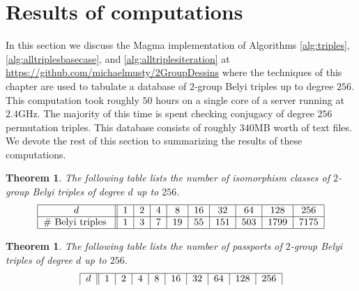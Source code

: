 \documentclass{dcthesis}
\numberwithin{equation}{section}
\newtheorem{theorem}[equation]{Theorem}
\theoremstyle{definition}
\theoremstyle{remark}
\begin{document}
{  \section{Results of computations}{\label{sec:grouptheorycomputations}
    In this section we discuss the
    \textsf{Magma} implementation of
    Algorithms
    \ref{alg:triples},
    \ref{alg:alltriplesbasecase},
    and
    \ref{alg:alltriplesiteration}
    at
    \url{https://github.com/michaelmusty/2GroupDessins}
    where the techniques of this chapter
    are used to tabulate a database
    of $2$-group Belyi triples
    up to degree $256$.
    This computation took roughly
    $50$ hours on a single core of a server
    running at $2.4$GHz.
    The majority
    of this time is spent
    checking conjugacy of degree $256$
    permutation triples.
    This database consists of
    roughly $340$MB worth of text files.
    We devote the rest of this section
    to summarizing the results of
    these computations.
    \begin{theorem}\label{thm:isoclasses}
      The following table lists
      the number of isomorphism classes of
      $2$-group Belyi triples
      of degree $d$ up to $256$.
      \begin{equation}
        \label{eqn:}
        \begin{tabular}{|c||c|c|c|c|c|c|c|c|c|}
          \hline
          $d$ & $1$ & $2$ & $4$ & $8$ & $16$ & $32$ & $64$ & $128$ & $256$\\
          \hline
          \#\text{ Belyi triples } & $1$ & $3$ & $7$ & $19$ & $55$ & $151$ & $503$ & $1799$ & $7175$\\
          \hline
        \end{tabular}
      \end{equation}
    \end{theorem}
    \begin{theorem}\label{thm:passports}
      The following table lists
      the number of passports of
      $2$-group Belyi triples
      of degree $d$ up to $256$.
      \begin{equation}
        \label{eqn:}
        \begin{tabular}{|c||c|c|c|c|c|c|c|c|c|}
          \hline
          $d$ & $1$ & $2$ & $4$ & $8$ & $16$ & $32$ & $64$ & $128$ & $256$\\

\end{tabular}
\end{equation}
\end{theorem}}}
\end{document}
